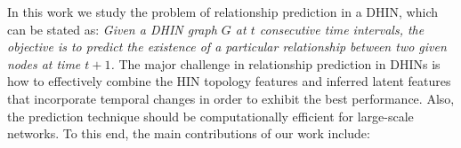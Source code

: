 In this work we study the problem of relationship prediction in a DHIN, which can be stated as: \textit{Given a DHIN graph $G$ at $t$ consecutive time intervals, the objective is to predict the existence of a particular relationship between two given nodes at time $t+1$.} The major challenge in relationship prediction in DHINs is how to effectively combine the HIN topology features and inferred latent features that incorporate temporal changes in order to exhibit the best performance. Also, the prediction technique should be computationally efficient for large-scale networks. To this end, the main contributions of our work include:












